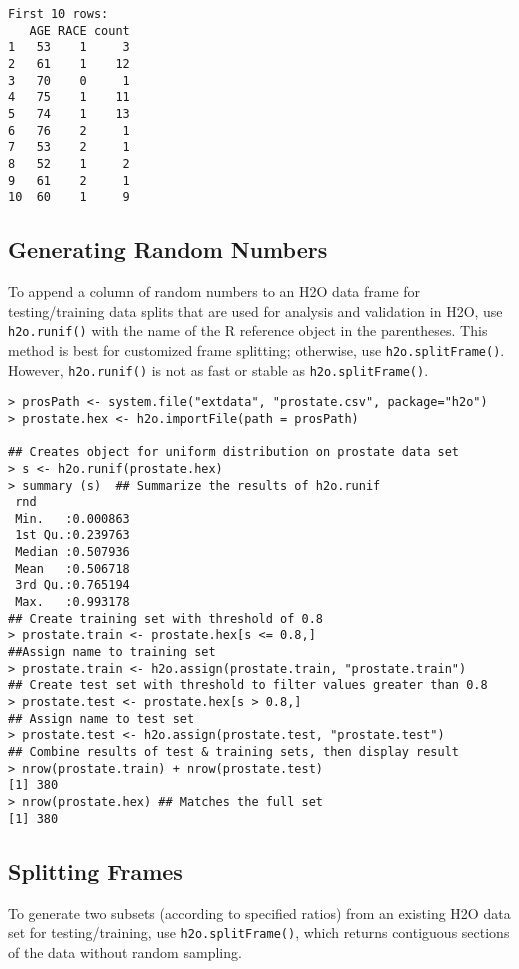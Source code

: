 {{\begin{lstlisting}[style=R]
First 10 rows:
   AGE RACE count
1   53    1     3
2   61    1    12
3   70    0     1
4   75    1    11
5   74    1    13
6   76    2     1
7   53    2     1
8   52    1     2
9   61    2     1
10  60    1     9
\end{lstlisting}
\newpage
\subsection{Generating Random Numbers}

To append a column of random numbers to an H2O data frame for testing/training data splits that are used for analysis and validation in H2O, use {\texttt{h2o.runif()}} with the name of the R reference object in the parentheses. This method is best for customized frame splitting; otherwise, use {\texttt{h2o.splitFrame()}}. However, {\texttt{h2o.runif()}} is not as fast or stable as {\texttt{h2o.splitFrame()}}. 

\begin{lstlisting}[style=R]
> prosPath <- system.file("extdata", "prostate.csv", package="h2o")
> prostate.hex <- h2o.importFile(path = prosPath)

## Creates object for uniform distribution on prostate data set
> s <- h2o.runif(prostate.hex)
> summary (s)  ## Summarize the results of h2o.runif
 rnd               
 Min.   :0.000863  
 1st Qu.:0.239763  
 Median :0.507936  
 Mean   :0.506718  
 3rd Qu.:0.765194  
 Max.   :0.993178  
## Create training set with threshold of 0.8
> prostate.train <- prostate.hex[s <= 0.8,]
##Assign name to training set
> prostate.train <- h2o.assign(prostate.train, "prostate.train")
## Create test set with threshold to filter values greater than 0.8
> prostate.test <- prostate.hex[s > 0.8,]
## Assign name to test set
> prostate.test <- h2o.assign(prostate.test, "prostate.test")
## Combine results of test & training sets, then display result
> nrow(prostate.train) + nrow(prostate.test)
[1] 380
> nrow(prostate.hex) ## Matches the full set
[1] 380
\end{lstlisting}
 

\subsection{Splitting Frames}

To generate two subsets (according to specified ratios) from an existing H2O data set for testing/training, use {\texttt{h2o.splitFrame()}}, which returns contiguous sections of the data without random sampling.

}}
